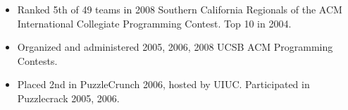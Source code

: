 \documentclass[line]{res}
\begin{document}
\begin{resume}


			\begin{itemize} \itemsep -2pt
				\item Ranked 5th of 49 teams in 2008 Southern California Regionals of the ACM International Collegiate Programming Contest. Top 10 in 2004.
				\item Organized and administered 2005, 2006, 2008 UCSB ACM Programming Contests.
				\item Placed 2nd in PuzzleCrunch 2006, hosted by UIUC. Participated in Puzzlecrack 2005, 2006.
			\end{itemize}
		


\end{resume}
\end{document}
